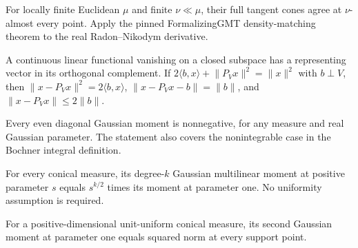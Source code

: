 \begin{lemma}
\label{lem:absolute-continuity-tangent-cones}

For locally finite Euclidean $\mu$ and finite $\nu\ll\mu$, their full tangent cones agree at $\nu$-almost every point. Apply the pinned FormalizingGMT density-matching theorem to the real Radon--Nikodym derivative.
\end{lemma}

\begin{lemma}
\label{lem:normal-coordinate-identities}

A continuous linear functional vanishing on a closed subspace has a representing vector in its orthogonal complement. If $2\langle b,x\rangle+\lVert P_Vx\rVert^2=\lVert x\rVert^2$ with $b\perp V$, then $\lVert x-P_Vx\rVert^2=2\langle b,x\rangle$, $\lVert x-P_Vx-b\rVert=\lVert b\rVert$, and $\lVert x-P_Vx\rVert\leq2\lVert b\rVert$.
\end{lemma}

\begin{lemma}
\label{lem:even-moment-positivity}

Every even diagonal Gaussian moment is nonnegative, for any measure and real Gaussian parameter. The statement also covers the nonintegrable case in the Bochner integral definition.
\end{lemma}

\begin{lemma}
\label{lem:conical-moment-scaling}

For every conical measure, its degree-$k$ Gaussian multilinear moment at positive parameter $s$ equals $s^{k/2}$ times its moment at parameter one. No uniformity assumption is required.
\end{lemma}

\begin{lemma}
\label{lem:conical-support-covariance}

For a positive-dimensional unit-uniform conical measure, its second Gaussian moment at parameter one equals squared norm at every support point.
\end{lemma}

